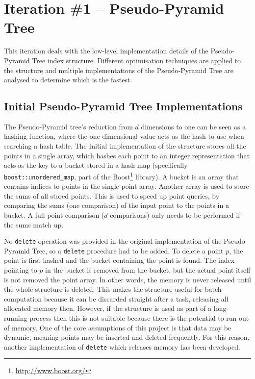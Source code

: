 \section{Iteration \#1 -- Pseudo-Pyramid Tree}

This iteration deals with the low-level implementation details of the Pseudo-Pyramid Tree index structure. Different optimisation techniques are applied to the structure and multiple implementations of the Pseudo-Pyramid Tree are analysed to determine which is the fastest.

\subsection{Initial Pseudo-Pyramid Tree Implementations}

The Pseudo-Pyramid tree's reduction from $d$ dimensions to one can be seen as a hashing function, where the one-dimensional value acts as the hash to use when searching a hash table. The Initial implementation of the structure stores all the points in a single array, which hashes each point to an integer representation that acts as the key to a bucket stored in a hash map (specifically \texttt{boost::unordered\_map}, part of the Boost\footnote{\url{http://www.boost.org/}} library). A bucket is an array that contains indices to points in the single point array. Another array is used to store the sums of all stored points. This is used to speed up point queries, by comparing the sums (one comparison) of the input point to the points in a bucket. A full point comparison ($d$ comparisons) only needs to be performed if the sums match up.

No \texttt{delete} operation was provided in the original implementation of the Pseudo-Pyramid Tree, so a \texttt{delete} procedure had to be added. To delete a point $p$, the point is first hashed and the bucket containing the point is found. The index pointing to $p$ in the bucket is removed from the bucket, but the actual point itself is not removed the point array. In other words, the memory is never released until the whole structure is deleted. This makes the structure useful for batch computation because it can be discarded straight after a task, releasing all allocated memory then. However, if the structure is used as part of a long-running process then this is not suitable because there is the potential to run out of memory.  One of the core assumptions of this project is that data may be dynamic, meaning points may be inserted and deleted frequently. For this reason, another implementation of \texttt{delete} which releases memory has been developed.

